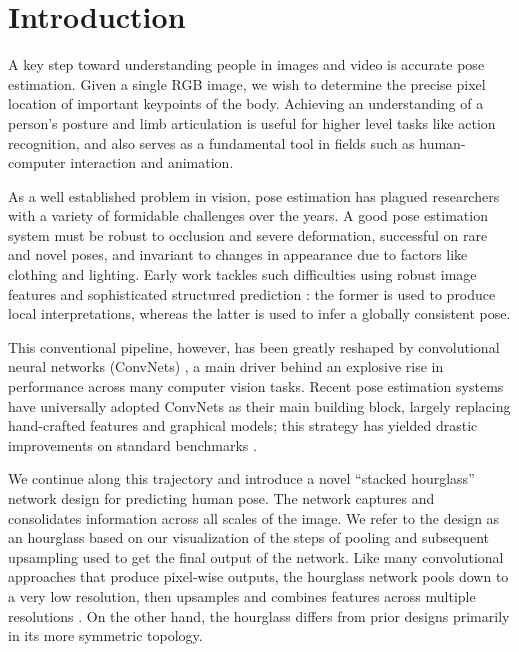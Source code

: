 \documentclass[runningheads]{llncs}
\begin{document}
\section{Introduction}

A key step toward understanding people in images and video is accurate
pose estimation. Given a single RGB image, we wish to determine the
precise pixel location of important keypoints of the body. Achieving
an understanding of a person's posture and limb articulation is
useful for higher level tasks like action recognition, and also
serves as a fundamental tool in fields such as human-computer
interaction and animation.

As a well established problem in vision, pose estimation has plagued
researchers with a variety of formidable challenges over the years. A
good pose estimation system must be robust to occlusion and severe
deformation, successful on rare and novel poses, and invariant to
changes in appearance due to factors like clothing and lighting. Early
work tackles such difficulties using robust image features and
sophisticated structured prediction \cite{sapp2013modec, felz08,
  pish13strong, bourdev2009poselets, johnson2011learning,
  ramanan2006learning, yang2013articulated, ferrari2008progressive,
  ladicky2013human}: the former is used to produce local
interpretations, whereas the latter is used to infer a globally
consistent pose.

This conventional pipeline, however, has been greatly reshaped by
convolutional neural networks (ConvNets) \cite{lecun1998gradient,
  krizhevsky2012imagenet, szegedy2015going, ioffe2015batch,
  he2015deep}, a main driver behind an explosive rise in performance
across many computer vision tasks. Recent pose estimation systems
\cite{tompson2014joint, tompson2015efficient, pish15deepcut,
  wei2016machines, carreira2015human, fan2015combining} have
universally adopted ConvNets as their main building block, largely
replacing hand-crafted features and graphical models; this strategy
has yielded drastic improvements on standard benchmarks
\cite{sapp2013modec, andriluka20142d, johnson2010clustered}.

We continue along this trajectory and introduce a novel ``stacked
hourglass'' network design for predicting human pose. The network
captures and consolidates information across all scales of the
image. We refer to the design as an hourglass based on our
visualization of the steps of pooling and subsequent upsampling used
to get the final output of the network. Like many convolutional
approaches that produce pixel-wise outputs, the hourglass network
pools down to a very low resolution, then upsamples and combines
features across multiple resolutions \cite{tompson2014joint,
  long2015fully}. On the other hand, the hourglass differs from prior
designs primarily in its more symmetric topology.
\end{document}
